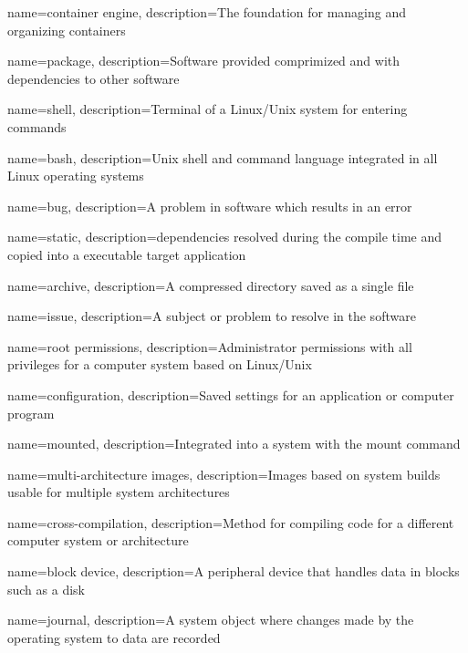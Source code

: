 {
    name={container engine},
    description={The foundation for managing and organizing containers}
}

{
    name={package},
    description={Software provided comprimized and with dependencies to other software}
}

{
    name={shell},
    description={Terminal of a Linux/Unix system for entering commands}
}

{
    name={bash},
    description={Unix shell and command language integrated in all Linux operating systems}
}

{
    name={bug},
    description={A problem in software which results in an error}
}

{
    name={static},
    description={dependencies resolved during the compile time and copied into a executable target application}
}

{
    name={archive},
    description={A compressed directory saved as a single file}
}

{
    name={issue},
    description={A subject or problem to resolve in the software}
}

{
    name={root permissions},
    description={Administrator permissions with all privileges for a computer system based on Linux/Unix}
}

{
    name={configuration},
    description={Saved settings for an application or computer program}
}

{
    name={mounted},
    description={Integrated into a system with the mount command}
}

{
    name={multi-architecture images},
    description={Images based on system builds usable for multiple system architectures}
}

{
    name={cross-compilation},
    description={Method for compiling code for a different computer system or architecture}
}

{
    name={block device},
    description={A peripheral device that handles data in blocks such as a disk}
}

{
    name={journal},
    description={A system object where changes made by the operating system to data are recorded}
}

